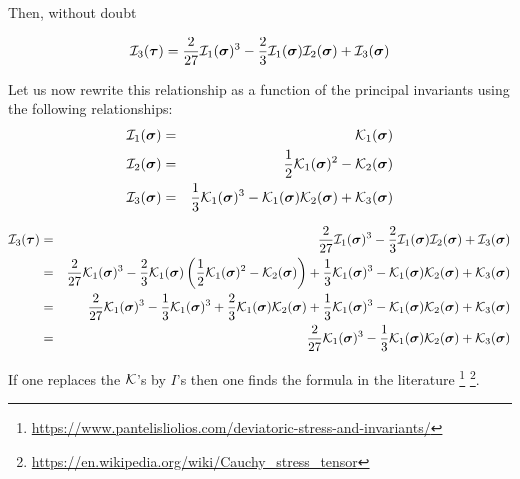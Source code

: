Then, without doubt

\begin{mdframed}[backgroundcolor=blue!5]
\[
{\cal I}_3(\bm\tau) =
 \frac{2}{27}  {\cal I}_1(\bm\sigma)^3 - \frac23{\cal I}_1(\bm\sigma) {\cal I}_2(\bm\sigma)
+{\cal I}_3(\bm\sigma)
\]
\end{mdframed}


Let us now rewrite this relationship as a function of the principal invariants using the 
following relationships:
\begin{eqnarray}
{\cal I}_1({\bm \sigma})&=& {\cal K}_1({\bm \sigma}) \nonumber\\ 
{\cal I}_2({\bm \sigma})&=& \frac{1}{2}{\cal K}_1({\bm \sigma})^2-{\cal K}_2({\bm \sigma}) \nonumber\\
{\cal I}_3({\bm \sigma})&=& \frac{1}{3}{\cal K}_1({\bm \sigma})^3-{\cal K}_1({\bm \sigma}) \nonumber
{\cal K}_2({\bm \sigma}) +{\cal K}_3({\bm \sigma})
\end{eqnarray}

\begin{eqnarray}
{\cal I}_3(\bm\tau) 
&=& \frac{2}{27} {\cal I}_1(\bm\sigma)^3 
-\frac23 {\cal I}_1(\bm\sigma){\cal I}_2(\bm\sigma) + {\cal I}_3(\bm \sigma) \nonumber\\
&=& \frac{2}{27} {\cal K}_1(\bm\sigma)^3
-\frac23 {\cal K}_1(\bm\sigma)  \left( \frac{1}{2}{\cal K}_1({\bm \sigma})^2 -{\cal K}_2({\bm \sigma}) \right)
+ \frac{1}{3}{\cal K}_1({\bm \sigma})^3 -{\cal K}_1({\bm \sigma}) 
{\cal K}_2({\bm \sigma}) +{\cal K}_3({\bm \sigma}) \nonumber\\
&=& \frac{2}{27} {\cal K}_1(\bm\sigma)^3
-\frac13 {\cal K}_1(\bm\sigma)^3 
+\frac23 {\cal K}_1(\bm\sigma)  {\cal K}_2({\bm \sigma}) 
+ \frac{1}{3}{\cal K}_1({\bm \sigma})^3 -{\cal K}_1({\bm \sigma}) {\cal K}_2({\bm \sigma}) 
+{\cal K}_3({\bm \sigma}) \nonumber\\
&=& \frac{2}{27} {\cal K}_1(\bm\sigma)^3
-\frac13 {\cal K}_1(\bm\sigma)  {\cal K}_2({\bm \sigma}) 
+{\cal K}_3({\bm \sigma}) 
\end{eqnarray}

If one replaces the ${\cal K}$'s by $I$'s then one finds the formula in the literature 
\footnote{\url{https://www.pantelisliolios.com/deviatoric-stress-and-invariants/}}
\footnote{\url{https://en.wikipedia.org/wiki/Cauchy_stress_tensor}}.





